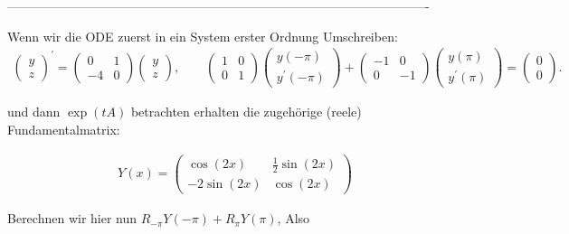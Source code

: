 \begin{solution}
\begin{enumerate}[label = \textbf{\alph*)}]
 ----------------------------------------------------------------------------------------------------

  Wenn wir die ODE zuerst in ein System erster Ordnung Umschreiben:
    \begin{align*}
      \begin{pmatrix}
        y \\ z
      \end{pmatrix}^{\prime} =
      \begin{pmatrix}
        0 & 1 \\ -4 & 0
      \end{pmatrix}
      \begin{pmatrix}
        y \\ z
      \end{pmatrix}, \qquad
      \begin{pmatrix}
        1 & 0 \\ 0 & 1
      \end{pmatrix}
      \begin{pmatrix}
        y(-\pi) \\ y^{\prime}(-\pi)
      \end{pmatrix}
      +
      \begin{pmatrix}
        -1 & 0 \\ 0 & -1
      \end{pmatrix}
      \begin{pmatrix}
        y(\pi) \\ y^{\prime}(\pi)
      \end{pmatrix}
      =
      \begin{pmatrix}
        0 \\ 0
      \end{pmatrix}.
    \end{align*}

  und dann $\exp(tA)$ betrachten erhalten die zugehörige (reele) Fundamentalmatrix:

  \begin{align*}
    Y(x)
    =
    \begin{pmatrix}
    \cos(2x) & \frac{1}{2}\sin(2x) \\
    -2\sin(2x) & \cos(2x)
    \end{pmatrix}
  \end{align*}

  Berechnen wir hier nun $R_{-\pi}Y(-\pi)+R_{\pi}Y(\pi)$, Also


\end{enumerate}
\end{solution}
